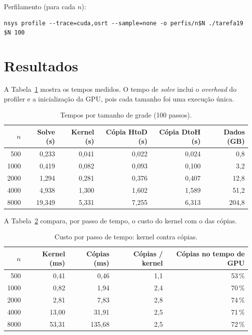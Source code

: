 \documentclass[a4paper,12pt]{article}
\begin{document}
Perfilamento (para cada $n$):

\begin{lstlisting}[style=cstyle, language={}, numbers=none]
nsys profile --trace=cuda,osrt --sample=none -o perfis/n$N ./tarefa19 $N 100
\end{lstlisting}

\section{Resultados}

A Tabela~\ref{tab:tempos} mostra os tempos medidos. O tempo de \emph{solve} inclui o \emph{overhead} do profiler e a inicialização da GPU, pois cada tamanho foi uma execução única.

\begin{table}[H]
\centering
\caption{Tempos por tamanho de grade (100 passos).}
\label{tab:tempos}
\begin{tabular}{rrrrrr}
\toprule
$n$ & Solve (s) & Kernel (s) & Cópia HtoD (s) & Cópia DtoH (s) & Dados (GB) \\
\midrule
500  & 0{,}233  & 0{,}041 & 0{,}022 & 0{,}024 & 0{,}8 \\
1000 & 0{,}419  & 0{,}082 & 0{,}093 & 0{,}100 & 3{,}2 \\
2000 & 1{,}294  & 0{,}281 & 0{,}376 & 0{,}407 & 12{,}8 \\
4000 & 4{,}938  & 1{,}300 & 1{,}602 & 1{,}589 & 51{,}2 \\
8000 & 19{,}349 & 5{,}331 & 7{,}255 & 6{,}313 & 204{,}8 \\
\bottomrule
\end{tabular}
\end{table}

A Tabela~\ref{tab:passo} compara, por passo de tempo, o custo do kernel com o das cópias.

\begin{table}[H]
\centering
\caption{Custo por passo de tempo: kernel contra cópias.}
\label{tab:passo}
\begin{tabular}{rrrrr}
\toprule
$n$ & Kernel (ms) & Cópias (ms) & Cópias / kernel & Cópias no tempo de GPU \\
\midrule
500  & 0{,}41  & 0{,}46   & 1{,}1 & 53\,\% \\
1000 & 0{,}82  & 1{,}94   & 2{,}4 & 70\,\% \\
2000 & 2{,}81  & 7{,}83   & 2{,}8 & 74\,\% \\
4000 & 13{,}00 & 31{,}91  & 2{,}5 & 71\,\% \\
8000 & 53{,}31 & 135{,}68 & 2{,}5 & 72\,\% \\
\bottomrule
\end{tabular}
\end{table}
\end{document}
